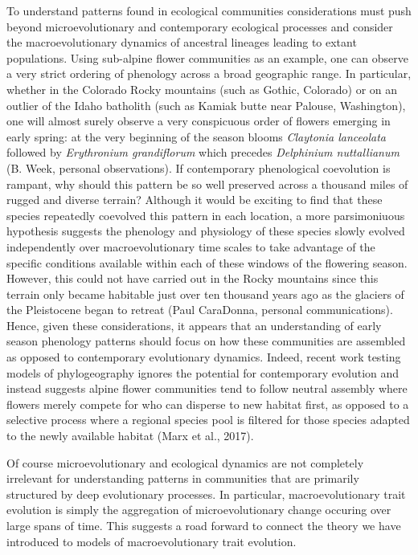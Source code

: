 \documentclass[]{elsarticle} %
\begin{document}
To understand patterns found in ecological communities considerations
must push beyond microevolutionary and contemporary ecological processes
and consider the macroevolutionary dynamics of ancestral lineages
leading to extant populations. Using sub-alpine flower communities as an
example, one can observe a very strict ordering of phenology across a
broad geographic range. In particular, whether in the Colorado Rocky
mountains (such as Gothic, Colorado) or on an outlier of the Idaho
batholith (such as Kamiak butte near Palouse, Washington), one will
almost surely observe a very conspicuous order of flowers emerging in
early spring: at the very beginning of the season blooms \emph{Claytonia
lanceolata} followed by \emph{Erythronium grandiflorum} which precedes
\emph{Delphinium nuttallianum} (B. Week, personal observations). If
contemporary phenological coevolution is rampant, why should this
pattern be so well preserved across a thousand miles of rugged and
diverse terrain? Although it would be exciting to find that these
species repeatedly coevolved this pattern in each location, a more
parsimoniuous hypothesis suggests the phenology and physiology of these
species slowly evolved independently over macroevolutionary time scales
to take advantage of the specific conditions available within each of
these windows of the flowering season. However, this could not have
carried out in the Rocky mountains since this terrain only became
habitable just over ten thousand years ago as the glaciers of the
Pleistocene began to retreat (Paul CaraDonna, personal communications).
Hence, given these considerations, it appears that an understanding of
early season phenology patterns should focus on how these communities
are assembled as opposed to contemporary evolutionary dynamics. Indeed,
recent work testing models of phylogeography ignores the potential for
contemporary evolution and instead suggests alpine flower communities
tend to follow neutral assembly where flowers merely compete for who can
disperse to new habitat first, as opposed to a selective process where a
regional species pool is filtered for those species adapted to the newly
available habitat (Marx et al., 2017).

Of course microevolutionary and ecological dynamics are not completely
irrelevant for understanding patterns in communities that are primarily
structured by deep evolutionary processes. In particular,
macroevolutionary trait evolution is simply the aggregation of
microevolutionary change occuring over large spans of time. This
suggests a road forward to connect the theory we have introduced to
models of macroevolutionary trait evolution.
\end{document}
